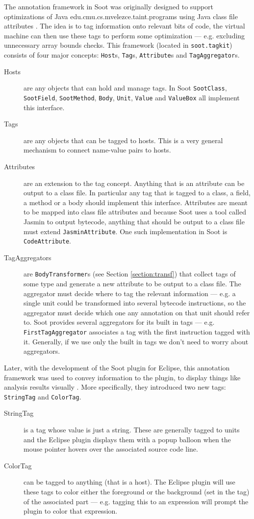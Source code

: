 \documentclass{article}
\newcommand{\code}[1]{\texttt{\small #1}}
\begin{document}
The annotation framework in Soot was originally designed to support
optimizations of Java edu.cmu.cs.mvelezce.taint.programs using Java class file attributes
\cite{pominville00framework}. The idea is to tag information onto
relevant bits of code, the virtual machine can then use these tags to
perform some optimization --- e.g. excluding unnecessary array bounds
checks.  This framework (located in \code{soot.tagkit}) consists of
four major concepts: \code{Host}s, \code{Tag}s, \code{Attribute}s and
\code{TagAggregator}s.
\begin{description}
\item[Hosts] are any objects that can hold and manage tags. In Soot
  \code{SootClass}, \code{SootField}, \code{SootMethod}, \code{Body},
  \code{Unit}, \code{Value} and \code{ValueBox} all implement this
  interface.
\item[Tags] are any objects that can be tagged to hosts. This is a
  very general mechanism to connect name-value pairs to hosts.
\item[Attributes] are an extension to the tag concept. Anything that
  is an attribute can be output to a class file. In particular any tag
  that is tagged to a class, a field, a method or a body should
  implement this interface. Attributes are meant to be mapped into
  class file attributes and because Soot uses a tool called Jasmin to
  output bytecode, anything that should be output to a class file must
  extend \code{JasminAttribute}. One such implementation in Soot is
  \code{CodeAttribute}.
\item[TagAggregators] are \code{BodyTransformer}s (see
  Section \ref{section:transf}) that collect tags of some type and generate
  a new attribute to be output to a class file. The aggregator must
  decide where to tag the relevant information --- e.g. a single unit
  could be transformed into several bytecode instructions, so the
  aggregator must decide which one any annotation on that unit should
  refer to. Soot provides several aggregators for its built in tags
  --- e.g. \code{FirstTagAggregator} associates a tag with the first
  instruction tagged with it. Generally, if we use only the built in
  tags we don't need to worry about aggregators.
\end{description}

Later, with the development of the Soot plugin for Eclipse, this
annotation framework was used to convey information to the plugin, to
display things like analysis results visually \cite{lhot.lhot.ea04}.
More specifically, they introduced two new tags: \code{StringTag} and
\code{ColorTag}.
\begin{description}
\item[StringTag] is a tag whose value is just a string. These are
  generally tagged to units and the Eclipse plugin displays them with
  a popup balloon when the mouse pointer hovers over the associated
  source code line.
\item[ColorTag] can be tagged to anything (that is a host). The
  Eclipse plugin will use these tags to color either the foreground or
  the background (set in the tag) of the associated part --- e.g.
  tagging this to an expression will prompt the plugin to color that
  expression.
\end{description}
\end{document}
